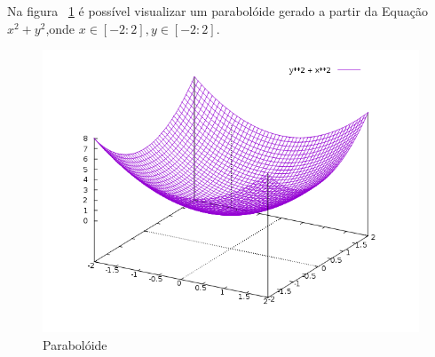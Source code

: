 \documentclass[
	article,			%
	11pt,				%
	oneside,			%
	a4paper,			%
	english,			%
	brazil,				%
	]{abntex2}
\begin{document}
		Na figura ~\ref{img:parab} é possível visualizar um parabolóide gerado a
		partir da Equação $x^2 + y^2$,onde $x \in[-2:2], y\in[-2:2]$.
				\begin{figure}[H]
					\includegraphics[width=\textwidth,keepaspectratio]{paraboloid.png}
					\caption{Parabolóide}
					\label{img:parab}
				\end{figure}

	
	\nocite{winterle2000vetores}
	\nocite{abbena2006modern}
	\nocite{hilbert1999geometry}
	
\end{document}
